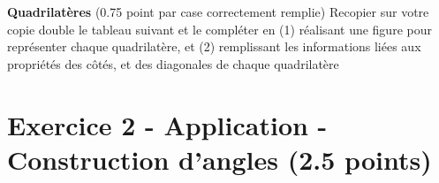 \documentclass[answers]{exam}
\begin{document}
\begin{questions}
\begin{parts}
\begin{solution}

    \end{solution}
    \end{parts}
  \question[4.5] \textbf{Quadrilatères} (0.75 point par case correctement remplie)
    Recopier sur votre copie double le tableau suivant et le compléter en (1) réalisant une figure pour représenter chaque quadrilatère, et (2) remplissant les informations liées aux propriétés des côtés, et des diagonales de chaque quadrilatère


\begin{solution}
\end{solution}

  \end{questions}

\section*{Exercice 2 - Application - Construction d'angles (2.5 points)}
\end{document}
